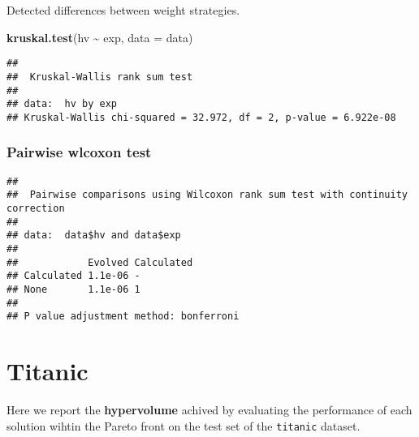 \documentclass[
]{book}
\newenvironment{Shaded}{\begin{snugshade}}{\end{snugshade}}
\newcommand{\AttributeTok}[1]{\textcolor[rgb]{0.13,0.29,0.53}{#1}}
\newcommand{\ConstantTok}[1]{\textcolor[rgb]{0.56,0.35,0.01}{#1}}
\newcommand{\FunctionTok}[1]{\textcolor[rgb]{0.13,0.29,0.53}{\textbf{#1}}}
\newcommand{\NormalTok}[1]{#1}
\newcommand{\SpecialCharTok}[1]{\textcolor[rgb]{0.81,0.36,0.00}{\textbf{#1}}}
\newcommand{\StringTok}[1]{\textcolor[rgb]{0.31,0.60,0.02}{#1}}
\begin{document}
Detected differences between weight strategies.

\begin{Shaded}
\begin{Highlighting}[]
\FunctionTok{kruskal.test}\NormalTok{(hv }\SpecialCharTok{\textasciitilde{}}\NormalTok{ exp, }\AttributeTok{data =}\NormalTok{ data)}
\end{Highlighting}
\end{Shaded}

\begin{verbatim}
## 
##  Kruskal-Wallis rank sum test
## 
## data:  hv by exp
## Kruskal-Wallis chi-squared = 32.972, df = 2, p-value = 6.922e-08
\end{verbatim}

\hypertarget{pairwise-wlcoxon-test-3}{%
\subsection{Pairwise wlcoxon test}\label{pairwise-wlcoxon-test-3}}

\begin{Shaded}
\end{Shaded}

\begin{verbatim}
## 
##  Pairwise comparisons using Wilcoxon rank sum test with continuity correction 
## 
## data:  data$hv and data$exp 
## 
##            Evolved Calculated
## Calculated 1.1e-06 -         
## None       1.1e-06 1         
## 
## P value adjustment method: bonferroni
\end{verbatim}

\hypertarget{titanic}{%
\chapter{Titanic}\label{titanic}}

Here we report the \textbf{hypervolume} achived by evaluating the performance of each solution wihtin the Pareto front on the test set of the \texttt{titanic} dataset.
\end{document}
